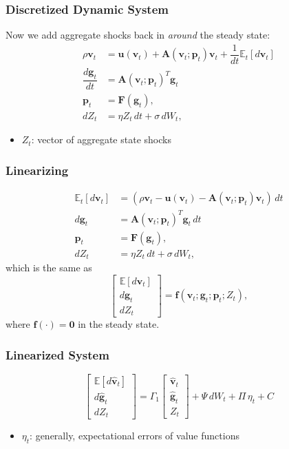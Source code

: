 \documentclass{beamer}
\newcommand{\bff}{\mathbf{f}}
\newcommand{\bfg}{\mathbf{g}}
\newcommand{\bfp}{\mathbf{p}}
\newcommand{\bfu}{\mathbf{u}}
\newcommand{\bfv}{\mathbf{v}}
\newcommand{\bfA}{\mathbf{A}}
\newcommand{\bfF}{\mathbf{F}}
\newcommand{\bfzero}{\mathbf{0}}
\newcommand{\E}{\mathbb{E}}
\begin{document}
\begin{frame}
  \frametitle{Discretized Dynamic System}
Now we add aggregate shocks back in \textit{around} the steady state:
\begin{equation}
\begin{split}
\rho \bfv_t & = \bfu(\bfv_t) + \bfA(\bfv_t;\bfp_t)\bfv_t + \dfrac{1}{dt}\E_t[d\bfv_t]\\
\dfrac{d\bfg_t}{dt} & = \bfA(\bfv_t;\bfp_t)^T\bfg_t\\
\bfp_t & = \bfF(\bfg_t),\\
dZ_t & = \eta Z_t\,dt + \sigma\, dW_t,
\end{split}
\end{equation}
\begin{itemize}
\item $Z_t$: vector of aggregate state shocks
\end{itemize}
\end{frame}
\begin{frame}
  \frametitle{Linearizing}
\begin{equation}
\begin{split}
\E_t[d\bfv_t] & = \left(\rho \bfv_t- \bfu(\bfv_t)- \bfA(\bfv_t;\bfp_t)\bfv_t\right)\,dt\\
d\bfg_t & = \bfA(\bfv_t;\bfp_t)^T\bfg_t\,dt\\
\bfp_t & = \bfF(\bfg_t),\\
dZ_t & = \eta Z_t\,dt + \sigma\, dW_t,
\end{split}
\end{equation}
which is the same as
\begin{equation}
  \begin{bmatrix}
    \E[d\bfv_t]\\d\bfg_t\\dZ_t
  \end{bmatrix} = \bff(\bfv_t;\bfg_t;\bfp_t;Z_t),
\end{equation}
where $\bff(\cdot) = \bfzero$ in the steady state.
\end{frame}

\begin{frame}
\frametitle{Linearized System}
\begin{equation}\label{linearized system}
  \begin{bmatrix}
    \E[d\hat{\bfv}_t]\\d\hat{\bfg}_t\\dZ_t
  \end{bmatrix} = \Gamma_1
  \begin{bmatrix}
    \hat{\bfv}_t\\\hat{\bfg}_t\\ Z_t
  \end{bmatrix} + \Psi\, dW_t + \Pi\, \eta_t + C
\end{equation}
\begin{itemize}
\item $\eta_t$: generally, expectational errors of value functions
\end{itemize}
\end{frame}
\end{document}
